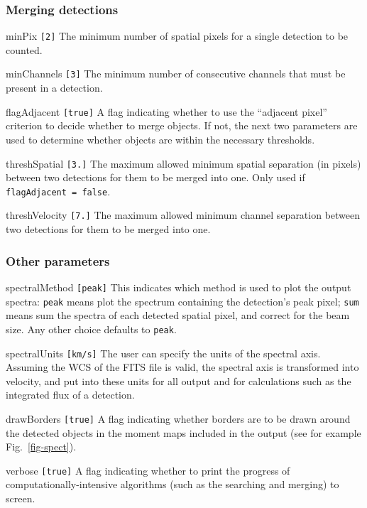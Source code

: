\documentclass[12pt,a4paper]{article}
\newcommand{\entrylabel}[1]{\mbox{\textsf{\bf{#1:}}}\hfil}
\newenvironment{entry}
        {\begin{list}{}%
                {\renewcommand{\makelabel}{\entrylabel}%
                        \setlength{\labelwidth}{30mm}%
                        \setlength{\labelsep}{5pt}%
                        \setlength{\itemsep}{2pt}%
                        \setlength{\parsep}{2pt}%
                        \setlength{\leftmargin}{35mm}%
                }%
        }%
{\end{list}}
\begin{document}
\subsubsection*{Merging detections}
\begin{entry}
\item[minPix \texttt{[2]}] The minimum number of spatial pixels for a single
  detection to be counted.
\item[minChannels \texttt{[3]}] The minimum number of consecutive
  channels that must be present in a detection.
\item[flagAdjacent \texttt{[true]}] A flag indicating whether to use the
  ``adjacent pixel'' criterion to decide whether to merge objects. If
  not, the next two parameters are used to determine whether objects
  are within the necessary thresholds.
\item[threshSpatial \texttt{[3.]}] The maximum allowed minimum spatial
  separation (in pixels) between two detections for them to be merged
  into one. Only used if \texttt{flagAdjacent = false}.
\item[threshVelocity \texttt{[7.]}] The maximum allowed minimum channel
  separation between two detections for them to be merged into
  one. 
\end{entry}

\subsubsection*{Other parameters}
\begin{entry}
\item[spectralMethod \texttt{[peak]}] This indicates which method is used
  to plot the output spectra: \texttt{peak} means plot the spectrum
  containing the detection's peak pixel; \texttt{sum} means sum the
  spectra of each detected spatial pixel, and correct for the beam
  size. Any other choice defaults to \texttt{peak}.
\item[spectralUnits \texttt{[km/s]}] The user can specify the units of
  the spectral axis. Assuming the WCS of the FITS file is valid, the
  spectral axis is transformed into velocity, and put into these units
  for all output and for calculations such as the integrated flux of a
  detection.
\item[drawBorders \texttt{[true]}] A flag indicating whether borders
  are to be drawn around the detected objects in the moment maps
  included in the output (see for example Fig.~\ref{fig-spect}).
\item[verbose \texttt{[true]}] A flag indicating whether to print the
  progress of computationally-intensive algorithms (such as the
  searching and merging) to screen.
\end{entry}
\end{document}
